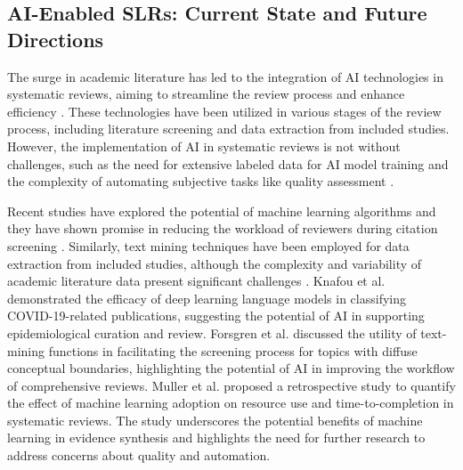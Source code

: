 \documentclass{article}
\begin{document}
\subsection{AI-Enabled SLRs: Current State and Future Directions}

The surge in academic literature has led to the integration of AI technologies in systematic reviews, aiming to streamline the review process and enhance efficiency \cite{o2019question, tsafnat2014systematic}. These technologies have been utilized in various stages of the review process, including literature screening and data extraction from included studies. However, the implementation of AI in systematic reviews is not without challenges, such as the need for extensive labeled data for AI model training and the complexity of automating subjective tasks like quality assessment \cite{marshall2019toward}.

Recent studies have explored the potential of machine learning algorithms and they have shown promise in reducing the workload of reviewers during citation screening \cite{o2019question}. Similarly, text mining techniques have been employed for data extraction from included studies, although the complexity and variability of academic literature data present significant challenges \cite{tsafnat2014systematic}. Knafou et al. \cite{knafou2023ensemble} demonstrated the efficacy of deep learning language models in classifying COVID-19-related publications, suggesting the potential of AI in supporting epidemiological curation and review. Forsgren et al. \cite{forsgren2023use} discussed the utility of text-mining functions in facilitating the screening process for topics with diffuse conceptual boundaries, highlighting the potential of AI in improving the workflow of comprehensive reviews. Muller et al. \cite{muller2023effect} proposed a retrospective study to quantify the effect of machine learning adoption on resource use and time-to-completion in systematic reviews. The study underscores the potential benefits of machine learning in evidence synthesis and highlights the need for further research to address concerns about quality and automation.
\end{document}
